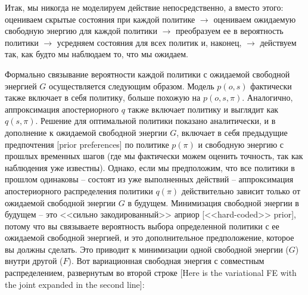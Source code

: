 \documentclass[twoside,leqno, 11pt]{article}
\begin{document}
	Итак, мы никогда не моделируем действие непосредственно, а вместо этого: оцениваем скрытые состояния при каждой политике $\rightarrow$ оцениваем ожидаемую свободную энергию для каждой политики $\rightarrow$ преобразуем ее в вероятность политики $\rightarrow$ усредняем состояния для всех политик и, наконец, $\rightarrow$ действуем так, как будто мы наблюдаем то, что мы ожидаем.
	
	
	Формально связывание вероятности каждой политики с ожидаемой свободной энергией $G$ осуществляется следующим образом. Модель $p(o,s)$ фактически также включает в себя политику, больше похожую на $p(o,s,\pi)$. Аналогично, аппроксимация апостериорного $q$ также включает политику и выглядит как $q(s,\pi)$. Решение для оптимальной политики показано аналитически, и в дополнение к ожидаемой свободной энергии $G$, включает в себя предыдущие предпочтения [prior preferences] по политике $p(\pi)$ и свободную энергию с прошлых временных шагов (где мы фактически можем оценить точность, так как наблюдения уже известны). Однако, если мы предположим, что все политики в прошлом одинаковы -- состоят из уже выполненных действий -- аппроксимация апостериорного распределения политики $q(\pi)$ действительно зависит только от ожидаемой свободной энергии $G$ в будущем. Минимизация свободной энергии в будущем -- это <<сильно закодированный>> априор [<<hard-coded>> prior], потому что вы связываете вероятность выбора определенной политики с ее ожидаемой свободной энергией, и это дополнительное предположение, которое вы должны сделать. Это приводит к минимизации одной свободной энергии ($G$) внутри другой ($F$). Вот вариационная свободная энергия с совместным распределением, развернутым во второй строке [Here is the variational FE with the joint expanded in the second line]:
	
	
\end{document}
